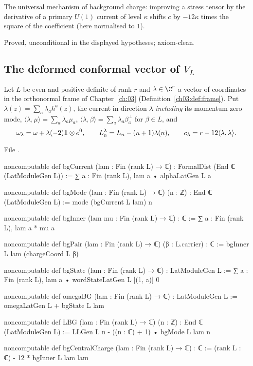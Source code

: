 \begin{physics}
The universal mechanism of background charge: improving a stress tensor by the derivative of a primary $U(1)$
current of level $\kappa$ shifts $c$ by $-12\kappa$ times the square of the coefficient (here normalised to $1$).
\end{physics}

\begin{status}
Proved, unconditional in the displayed hypotheses; axiom-clean.
\end{status}

\subsection{The deformed conformal vector of \texorpdfstring{$V_L$}{V\_L}}

\begin{definition}\label{l05:def:latbg}
Let $L$ be even and positive-definite of rank $r$ and $\lambda\in\C^r$ a vector of coordinates in the orthonormal frame of
Chapter~\ref{ch:03} (Definition~\ref{ch03:def:frame}). Put $\lambda(z)=\sum_a\lambda_ah^a(z)$, the current in direction
$\lambda$ \emph{including} its momentum zero mode, $\langle\lambda,\mu\rangle=\sum_a\lambda_a\mu_a$,
$\langle\lambda,\beta\rangle=\sum_a\lambda_a\beta^\perp_a$ for $\beta\in L$, and
\begin{equation*}
\omega_\lambda=\omega+\lambda(-2)\mathbf{1}\otimes e^0,\qquad L^\lambda_n=L_n-(n+1)\lambda(n),\qquad
c_\lambda=r-12\langle\lambda,\lambda\rangle .
\end{equation*}
\end{definition}

\noindent File .
\begin{leancode}
noncomputable def bgCurrent (lam : Fin (rank L) → ℂ) : FormalDist (End ℂ (LatModuleGen L)) :=
  ∑ a : Fin (rank L), lam a • alphaLatGen L a

noncomputable def bgMode (lam : Fin (rank L) → ℂ) (n : ℤ) : End ℂ (LatModuleGen L) :=
  mode (bgCurrent L lam) n

noncomputable def bgInner (lam mu : Fin (rank L) → ℂ) : ℂ := ∑ a : Fin (rank L), lam a * mu a

noncomputable def bgPair (lam : Fin (rank L) → ℂ) (β : L.carrier) : ℂ :=
  bgInner L lam (chargeCoord L β)

noncomputable def bgState (lam : Fin (rank L) → ℂ) : LatModuleGen L :=
  ∑ a : Fin (rank L), lam a • wordStateLatGen L [(1, a)] 0

noncomputable def omegaBG (lam : Fin (rank L) → ℂ) : LatModuleGen L :=
  omegaLatGen L + bgState L lam

noncomputable def LBG (lam : Fin (rank L) → ℂ) (n : ℤ) : End ℂ (LatModuleGen L) :=
  LLGen L n - ((n : ℂ) + 1) • bgMode L lam n

noncomputable def bgCentralCharge (lam : Fin (rank L) → ℂ) : ℂ :=
  (rank L : ℂ) - 12 * bgInner L lam lam
\end{leancode}

